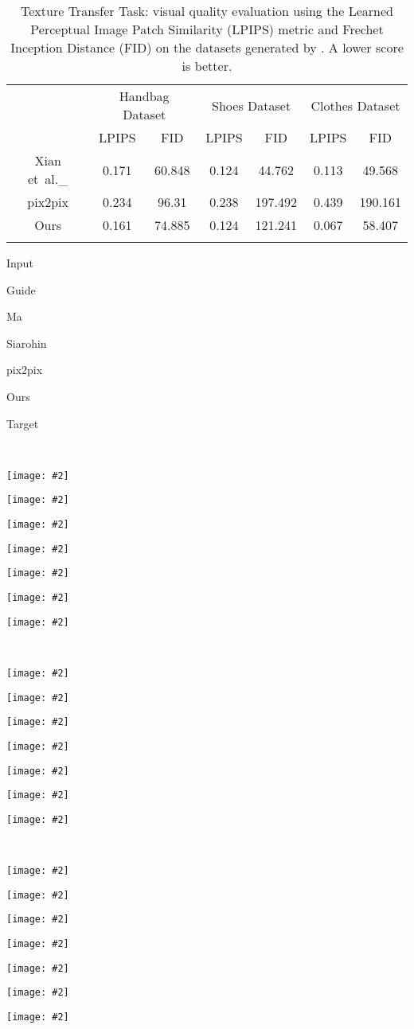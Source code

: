 \documentclass[10pt,twocolumn,letterpaper]{article}
\def\etal{et~al.\_}			  \def\eg{e.g.,~}               \def\ie{i.e.,~}               \def\etc{etc}                 \def\cf{cf.~}                 \def\viz{viz.~}               \def\vs{vs.~}
\newlength\secmargin
\newlength\figcapmargin
\newlength\tabmargin
\newcommand{\mpage}[2]
{
\begin{minipage}{#1\linewidth}\centering
#2
\end{minipage}
}
\newcommand{\mfigure}[2]
{
\begin{minipage}{#1\linewidth}\centering
\texttt{[image: \#2]}
\end{minipage}
}
\begin{document}
\begin{table}[t]\setlength{\tabcolsep}{2pt}
	\centering\footnotesize
	\caption{Texture Transfer Task: visual quality evaluation using the Learned Perceptual Image Patch Similarity (LPIPS) metric \cite{zhang2018perceptual} and Frechet Inception Distance (FID) \cite{heusel2017gans} on the datasets generated by \cite{xian2018texturegan}. A lower score is better.}
	\begin{tabular}{ccccccc}
		\toprule
		        &  \multicolumn{2}{c}{Handbag Dataset} & \multicolumn{2}{c}{Shoes Dataset} & \multicolumn{2}{c}{Clothes Dataset}\\
		        & LPIPS & FID & LPIPS & FID & LPIPS & FID\\
		\midrule
        Xian \etal\cite{xian2018texturegan} & 0.171 & 60.848 & 0.124 &44.762 &0.113 & 49.568\\
        \midrule
        pix2pix \cite{isola2017image}       & 0.234 & 96.31 & 0.238 & 197.492&0.439 & 190.161\\
        Ours        & 0.161 & 74.885 &0.124 & 121.241 & 0.067  & 58.407\\
        \bottomrule
		\vspace{\tabmargin}
		\label{tab:texture}
	\end{tabular}
\end{table}

\begin{figure*}[t]
\centering
\mpage{0.11}{Input} \hfill
\mpage{0.11}{Guide}\hfill
\mpage{0.11}{Ma \cite{ma2017pose}} \hfill
\mpage{0.11}{Siarohin \cite{siarohin2018deformable}} \hfill
\mpage{0.11}{pix2pix \cite{isola2017image}} \hfill
\mpage{0.11}{Ours} \hfill
\mpage{0.11}{Target} \\
\mfigure{0.11}{{pose_results/input/7.png}}\hfill
\mfigure{0.11}{{pose_results/guide/7.png}}\hfill
\mfigure{0.11}{{pose_results/ma/7.png}}\hfill
\mfigure{0.11}{{pose_results/siarohin/7.png}}\hfill
\mfigure{0.11}{{pose_results/pix2pix/7.png}}\hfill
\mfigure{0.11}{{pose_results/ours/7.png}}\hfill
\mfigure{0.11}{{pose_results/target/7.png}} \\
\mfigure{0.11}{{pose_results/input/113.png}}\hfill
\mfigure{0.11}{{pose_results/guide/113.png}}\hfill
\mfigure{0.11}{{pose_results/ma/113.png}}\hfill
\mfigure{0.11}{{pose_results/siarohin/113.png}}\hfill
\mfigure{0.11}{{pose_results/pix2pix/113.png}}\hfill
\mfigure{0.11}{{pose_results/ours/113.png}}\hfill
\mfigure{0.11}{{pose_results/target/113.png}} \\
\mfigure{0.11}{{pose_results/input/94.png}}\hfill
\mfigure{0.11}{{pose_results/guide/94.png}}\hfill
\mfigure{0.11}{{pose_results/ma/94.png}}\hfill
\mfigure{0.11}{{pose_results/siarohin/94.png}}\hfill
\mfigure{0.11}{{pose_results/pix2pix/94.png}}\hfill
\mfigure{0.11}{{pose_results/ours/94.png}}\hfill
\mfigure{0.11}{{pose_results/target/94.png}} \\

\vspace{\figcapmargin}
\label{fig:pose}
\end{figure*} 
\vspace{\secmargin}
\end{document}
